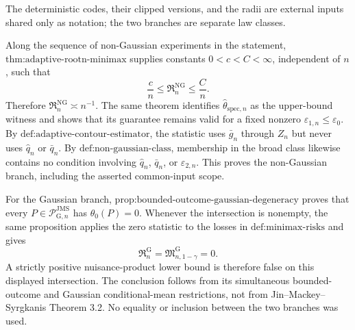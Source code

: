 The deterministic codes, their clipped versions, and the radii are external inputs shared only as notation; the two branches are separate law classes.

Along the sequence of non-Gaussian experiments in the statement,
\(\text{thm:adaptive-rootn-minimax}\) supplies constants \(0<c<C<\infty\), independent of \(n\), such that
\[
 \frac cn\le\mathfrak R_n^{\mathrm{NG}}\le\frac Cn.
\]
Therefore \(\mathfrak R_n^{\mathrm{NG}}\asymp n^{-1}\).  The same theorem identifies
\(\widehat\theta_{\mathrm{spec},n}\) as the upper-bound witness and shows that its guarantee remains valid for a fixed nonzero
\(\varepsilon_{1,n}\le\varepsilon_0\).  By
\(\text{def:adaptive-contour-estimator}\), the statistic uses \(\bar g_n\) through \(Z_n\) but never uses \(\widehat q_n\) or \(\bar q_n\).  By
\(\text{def:non-gaussian-class}\), membership in the broad class likewise contains no condition involving \(\widehat q_n\), \(\bar q_n\), or
\(\varepsilon_{2,n}\).  This proves the non-Gaussian branch, including the asserted common-input scope.

For the Gaussian branch,
\(\text{prop:bounded-outcome-gaussian-degeneracy}\) proves that every
\(P\in\mathcal P_{\mathrm G,n}^{\mathrm{JMS}}\) has \(\theta_0(P)=0\).  Whenever the intersection is nonempty, the same proposition applies the zero statistic to the losses in \(\text{def:minimax-risks}\) and gives
\[
 \mathfrak R_n^{\mathrm G}
 =\mathfrak M_{n,1-\gamma}^{\mathrm G}
 =0.
\]
A strictly positive nuisance-product lower bound is therefore false on this displayed intersection.  The conclusion follows from its simultaneous bounded-outcome and Gaussian conditional-mean restrictions, not from Jin--Mackey--Syrgkanis Theorem 3.2.  No equality or inclusion between the two branches was used.